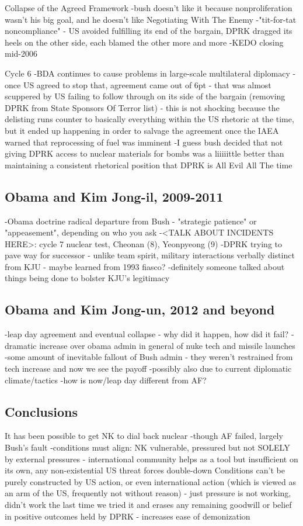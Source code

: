 \documentclass{article}
\begin{document}
Collapse of the Agreed Framework
	-bush doesn't like it because nonproliferation wasn't his big goal, and he doesn't like Negotiating With The Enemy
	-"tit-for-tat noncompliance" - US avoided fulfilling its end of the bargain, DPRK dragged its heels on the other side, each blamed the other more and more
	-KEDO closing mid-2006

Cycle 6
	-BDA continues to cause problems in large-scale multilateral diplomacy
	-once US agreed to stop that, agreement came out of 6pt - that was almost scuppered by US failing to follow through on its side of the bargain (removing DPRK from State Sponsors Of Terror list) - this is not shocking because the delisting runs counter to basically everything within the US rhetoric at the time, but it ended up happening in order to salvage the agreement once the IAEA warned that reprocessing of fuel was imminent
		-I guess bush decided that not giving DPRK access to nuclear materials for bombs was a liiiiittle better than maintaining a consistent rhetorical position that DPRK is All Evil All The time


\subsection{Obama and Kim Jong-il, 2009-2011}

-Obama doctrine radical departure from Bush - "strategic patience" or "appeasement", depending on who you ask
-<TALK ABOUT INCIDENTS HERE>: cycle 7 nuclear test, Cheonan (8), Yeonpyeong (9)
	-DPRK trying to pave way for successor - unlike team spirit, military interactions verbally distinct from KJU - maybe learned from 1993 fiasco?
	-definitely someone talked about things being done to bolster KJU's legitimacy
	
\subsection{Obama and Kim Jong-un, 2012 and beyond}
	-leap day agreement and eventual collapse - why did it happen, how did it fail?
	-dramatic increase over obama admin in general of nuke tech and missile launches
		-some amount of inevitable fallout of Bush admin - they weren't restrained from tech increase and now we see the payoff
		-possibly also due to current diplomatic climate/tactics
	-how is now/leap day different from AF?
	
\subsection{Conclusions}
It has been possible to get NK to dial back nuclear
	-though AF failed, largely Bush's fault
	-conditions must align: NK vulnerable, pressured but not SOLELY by external pressures - international community helps as a tool but insufficient on its own, any non-existential US threat forces double-down
Conditions can't be purely constructed by US action, or even international action (which is viewed as an arm of the US, frequently not without reason) - just pressure is not working, didn't work the last time we tried it and erases any remaining goodwill or belief in positive outcomes held by DPRK - increases ease of demonization
\end{document}
